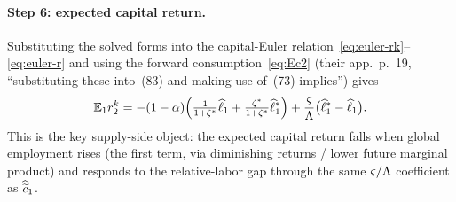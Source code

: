 \paragraph{Step 6: expected capital return.} Substituting the solved forms into
the capital-Euler relation~\eqref{eq:euler-rk}--\eqref{eq:euler-r} and using the
forward consumption~\eqref{eq:Ec2} (their app.~p.~19, ``substituting these
into~(83) and making use of~(73) implies'') gives
\begin{equation}
\mathbb{E}_1r^{k}_2 = -(1-\alpha)\Bigl(\tfrac{1}{1+\zeta^{*}}\widehat{\ell}_1+\tfrac{\zeta^{*}}{1+\zeta^{*}}\widehat{\ell}^{*}_1\Bigr)
+\frac{\varsigma}{\Lambda}\bigl(\widehat{\ell}^{*}_1-\widehat{\ell}_1\bigr). \label{eq:Er2k-solved}
\end{equation}
This is the key supply-side object: the expected capital return falls when global
employment rises (the first term, via diminishing returns / lower future
marginal product) and responds to the relative-labor gap through the same
$\varsigma/\Lambda$ coefficient as $\widehat{\widetilde{c}}_1$.

